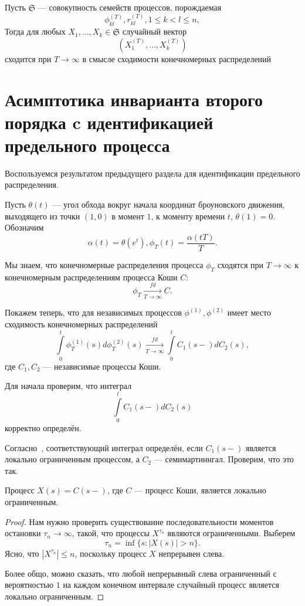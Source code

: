\documentclass[12pt, a4paper, titlepage]{article}
\begin{document}
\begin{theorem}
 Пусть $\mathfrak{S}$ --- совокупность семейств процессов, порождаемая 
$$\phi_{kl}^{(T)}, r_{kl}^{(T)}, 1 \le k < l \le n,$$
Тогда для любых $X_1, \ldots, X_k \in \mathfrak{S}$ случайный вектор
$$(X_1^{(T)}, \ldots, X_k^{(T)})$$
сходится при $T \to \infty$ в смысле сходимости конечномерных распределений
\end{theorem}
 
\section{Асимптотика инварианта второго порядка c идентификацией предельного процесса}
Воспользуемся результатом предыдущего раздела для идентификации предельного распределения.

Пусть $\theta(t)$ --- угол обхода вокруг начала координат 
броуновского движения, выходящего из точки $(1, 0)$ в момент $1$,
к моменту времени $t$, $\theta(1)=0.$
Обозначим 
$$\alpha(t)=\theta(e^t),
\phi_T(t)=\frac{\alpha(tT)}{T}.$$

Мы знаем, что конечномерные распределения процесса $\phi_T$ сходятся при $T\to\infty$
к конечномерным распределениям процесса Коши $C$:
$$\phi_T\xrightarrow[T\to\infty]{fd}C.$$

Покажем теперь, что для независимых процессов $\phi^{(1)}, \phi^{(2)}$
имеет место сходимость конечномерных распределений 
$$\int\limits_0^t \phi^{(1)}_T(s)d\phi^{(2)}_T(s)\xrightarrow[T\to\infty]{fd}
\int\limits_0^t C_1(s-)dC_2(s),$$
где $C_1, C_2$ --- независимые процессы Коши.

Для начала проверим, что интеграл
$$\int\limits_0^t C_1(s-)dC_2(s)$$
корректно определён. 

Согласно~\cite{Kallenberg}, соответствующий интеграл определён, если 
$C_1(s-)$ является локально ограниченным процессом, а
$C_2$ --- семимартиннгал. 
Проверим, что это так. 

\begin{statement}
 Процесс $X(s)=C(s-)$, где $C$ --- процесс Коши, является локально ограниченным.
\end{statement}
\begin{proof}
 Нам нужно проверить существование последовательности моментов остановки
 $\tau_n\to\infty$, такой, что процессы $X^{\tau_n}$
 являются ограниченными.
 Выберем 
 $$\tau_n=\inf\{s\colon |X(s)|>n\}.$$
 Ясно, что $|X^{\tau_n}|\le n$, поскольку процесс $X$ непрерывен слева. 
 
 Более общо, можно сказать, что любой непрерывный слева ограниченный с вероятностью $1$
 на каждом конечном интервале случайный процесс является локально ограниченным.  
\end{proof}
\end{document}

